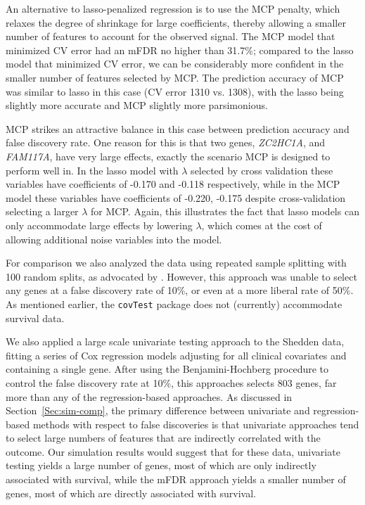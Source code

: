
An alternative to lasso-penalized regression is to use the MCP penalty, which relaxes the degree of shrinkage for large coefficients, thereby allowing a smaller number of features to account for the observed signal.  The MCP model that minimized CV error had an mFDR no higher than 31.7\%; compared to the lasso model that minimized CV error, we can be considerably more confident in the smaller number of features selected by MCP.  The prediction accuracy of MCP was similar to lasso in this case (CV error 1310 vs. 1308), with the lasso being slightly more accurate and MCP slightly more parsimonious.

MCP strikes an attractive balance in this case between prediction accuracy and false discovery rate.  One reason for this is that two genes, \textit{ZC2HC1A}, and \textit{FAM117A}, have very large effects, exactly the scenario MCP is designed to perform well in. In the lasso model with $\lambda$ selected by cross validation these variables have coefficients of -0.170 and -0.118 respectively, while in the MCP model these variables have coefficients of -0.220, -0.175 despite cross-validation selecting a larger $\lambda$ for MCP.  Again, this illustrates the fact that lasso models can only accommodate large effects by lowering $\lambda$, which comes at the cost of allowing additional noise variables into the model.

For comparison we also analyzed the data using repeated sample splitting with 100 random splits, as advocated by  \citet{Meinshausen2009}. However, this approach was unable to select any genes at a false discovery rate of 10\%, or even at a more liberal rate of 50\%.
As mentioned earlier, the {\tt covTest} package does not (currently) accommodate survival data.

We also applied a large scale univariate testing approach to the Shedden data, fitting a series of Cox regression models adjusting for all clinical covariates and containing a single gene.  After using the Benjamini-Hochberg procedure to control the false discovery rate at 10\%, this approaches selects 803 genes, far more than any of the regression-based approaches.  As discussed in Section~\ref{Sec:sim-comp}, the primary difference between univariate and regression-based methods with respect to false discoveries is that univariate approaches tend to select large numbers of features that are indirectly correlated with the outcome.  Our simulation results would suggest that for these data, univariate testing yields a large number of genes, most of which are only indirectly associated with survival, while the mFDR approach yields a smaller number of genes, most of which are directly associated with survival.

